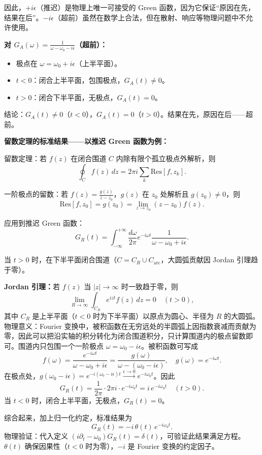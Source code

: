 \begin{derivationbox}
因此，$+i\epsilon$（推迟）是物理上唯一可接受的 Green 函数，因为它保证``原因在先，结果在后''。$-i\epsilon$（超前）虽然在数学上合法，但在散射、响应等物理问题中不允许使用。

\textbf{对 $G_A(\omega) = \frac{1}{\omega - \omega_0 - i\epsilon}$（超前）：}
\begin{itemize}
    \item 极点在 $\omega = \omega_0 + i\epsilon$（上半平面）。
    \item $t < 0$：闭合上半平面，包围极点，$G_A(t) \neq 0$。
    \item $t > 0$：闭合下半平面，无极点，$G_A(t) = 0$。
\end{itemize}
结论：$G_A(t) \neq 0$（$t < 0$），$G_A(t) = 0$（$t > 0$）。结果在先，原因在后——超前。

\textbf{留数定理的标准结果——以推迟 Green 函数为例：}

留数定理：若 $f(z)$ 在闭合围道 $C$ 内除有限个孤立极点外解析，则
\[
\oint_C f(z)\, dz = 2\pi i \sum_k \text{Res}[f, z_k].
\]

一阶极点的留数：若 $f(z) = \frac{g(z)}{z-z_0}$，$g(z)$ 在 $z_0$ 处解析且 $g(z_0) \neq 0$，则
\[
\text{Res}[f, z_0] = g(z_0) = \lim_{z\to z_0} (z-z_0)f(z).
\]

应用到推迟 Green 函数：
\[
G_R(t) = \int_{-\infty}^{+\infty} \frac{d\omega}{2\pi} e^{-i\omega t} \frac{1}{\omega - \omega_0 + i\epsilon}.
\]

当 $t > 0$ 时，在下半平面闭合围道（$C = C_R \cup C_{\text{arc}}$，大圆弧贡献因 Jordan 引理趋于零）。

\textbf{Jordan 引理：}若 $f(z)$ 当 $|z| \to \infty$ 时一致趋于零，则
\[
\lim_{R\to\infty} \int_{C_R} e^{izt} f(z)\, dz = 0 \quad (t > 0),
\]
其中 $C_R$ 是上半平面（$t < 0$ 时为下半平面）以原点为圆心、半径为 $R$ 的大圆弧。物理意义：Fourier 变换中，被积函数在无穷远处的半圆弧上因指数衰减而贡献为零，因此可以把沿实轴的积分转化为闭合围道积分，只计算围道内的极点留数即可。围道内只包围一个一阶极点 $\omega = \omega_0 - i\epsilon$。被积函数可写成
\[
f(\omega) = \frac{e^{-i\omega t}}{\omega - \omega_0 + i\epsilon} = \frac{g(\omega)}{\omega - (\omega_0 - i\epsilon)}, \quad g(\omega) = e^{-i\omega t}.
\]
在极点处，$g(\omega_0 - i\epsilon) = e^{-i(\omega_0 - i\epsilon)t} \xrightarrow{\epsilon\to 0} e^{-i\omega_0 t}$。因此
\[
G_R(t) = \frac{1}{2\pi} \cdot 2\pi i \cdot e^{-i\omega_0 t} = i\, e^{-i\omega_0 t} \quad (t > 0).
\]
当 $t < 0$ 时，闭合上半平面，无极点，$G_R(t) = 0$。

综合起来，加上归一化约定，标准结果为
\[
G_R(t) = -i\, \theta(t)\, e^{-i\omega_0 t}.
\]
物理验证：代入定义 $(i\partial_t - \omega_0) G_R(t) = \delta(t)$，可验证此结果满足方程。$\theta(t)$ 确保因果性（$t < 0$ 时为零），$-i$ 是 Fourier 变换的约定因子。


\end{derivationbox}

